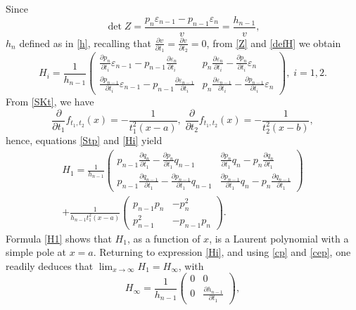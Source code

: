 \documentclass[10pt, reqno]{amsart}
\numberwithin{equation}{section}
\numberwithin{equation}{section}
\begin{document}
Since 
\begin{equation*}
\det Z=\frac{p_n\varepsilon_{n-1}-p_{n-1}\varepsilon_n}{v}=\frac{h_{n-1}}{v},
\end{equation*}
$h_n$ defined as in \eqref{h}, recalling that $\frac{\partial v}{\partial t_1}=\frac{\partial v}{\partial t_2}=0$, from \eqref{Z} and \eqref{defH} we obtain
\begin{equation} \label{Hi}
H_i=\frac{1}{h_{n-1}}
\begin{pmatrix} \frac{\partial p_n}{\partial t_i}\varepsilon_{n-1}-p_{n-1}\frac{\partial \varepsilon_n}{\partial t_i}& p_n\frac{\partial \varepsilon_n}{\partial t_i}-\frac{\partial p_n}{\partial t_i}\varepsilon_n\\
\frac{\partial p_{n-1}}{\partial t_i}\varepsilon_{n-1}-p_{n-1}\frac{\partial \varepsilon_{n-1}}{\partial t_i}& p_n\frac{\partial\varepsilon_{n-1}}{\partial t_i}-\frac{\partial p_{n-1}}{\partial t_i}\varepsilon_n\end{pmatrix},\; i=1, 2.
\end{equation}
From \eqref{SKt}, we have 
\begin{equation*}
\frac{\partial}{\partial t_1} f_{t_1,t_2}(x)=-\frac{1}{t_1^2(x-a)},\;\frac{\partial}{\partial t_2} f_{t_1,t_2}(x)=-\frac{1}{t_2^2(x-b)},
\end{equation*}
hence, equations \eqref{Stp} and \eqref{Hi} yield
\begin{multline} \label{H1}
H_1=\frac{1}{h_{n-1}}\begin{pmatrix} p_{n-1}\frac{\partial q_n}{\partial t_1}-\frac{\partial p_n}{\partial t_1}q_{n-1}&\frac{\partial p_n}{\partial t_1}q_n-p_n\frac{\partial q_n}{\partial t_1}\\
p_{n-1}\frac{\partial q_{n-1}}{\partial t_1}-\frac{\partial p_{n-1}}{\partial t_1}q_{n-1}&\frac{\partial p_{n-1}}{\partial t_1}q_n-p_n\frac{\partial q_{n-1}}{\partial t_1}\end{pmatrix}\\
+\frac{1}{h_{n-1}t_1^2(x-a)} \begin{pmatrix}p_{n-1}p_n&-p_n^2\\
p_{n-1}^2&-p_{n-1}p_n\end{pmatrix}.
\end{multline}
Formula \eqref{H1} shows that $H_1$, as a function of $x$, is a Laurent polynomial with a simple pole at $x=a$. Returning to expression \eqref{Hi}, and using \eqref{cp} and \eqref{cep}, one readily deduces that $\lim_{x \to \infty} H_1=H_{\infty}$, with
\begin{equation} \label{Hinf}
H_\infty=\frac{1}{h_{n-1}}\begin{pmatrix} 0&0\\0&\frac{\partial h_{n-1}}{\partial t_1}\end{pmatrix},
\end{equation}
\end{document}
